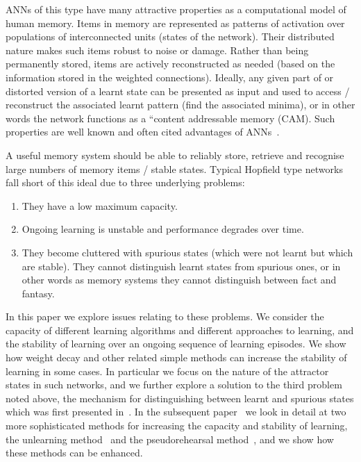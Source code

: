 ANNs of this type have many attractive properties as a computational model of human memory.   Items in memory are represented as patterns of activation over populations of interconnected units (states of the network).  Their distributed nature makes such items robust to noise or damage.  Rather than being permanently stored, items are actively reconstructed as needed (based on the information stored in the weighted connections).  Ideally, any given part of or distorted version of a learnt state can be presented as input and used to access / reconstruct the associated learnt pattern (find the associated minima), or in other words the network functions as a ``content addressable memory (CAM).  Such properties are well known and often cited advantages of ANNs~\citep{;;;etc}.

A useful memory system should be able to reliably store, retrieve and recognise large numbers of memory items / stable states.  Typical Hopfield type networks fall short of this ideal due to three underlying problems:

\begin{enumerate}
\item They have a low maximum capacity.  

\item Ongoing learning is unstable and performance degrades over time.  

\item They become cluttered with spurious states (which were not learnt but which are stable).  They cannot distinguish learnt states from spurious ones, or in other words as memory systems they cannot distinguish between fact and fantasy.  
\end{enumerate}

In this paper we explore issues relating to these problems.  We consider the capacity of different learning algorithms and different approaches to learning, and the stability of learning over an ongoing sequence of learning episodes.  We show how weight decay and other related simple methods can increase the stability of learning in some cases.  In particular we focus on the nature of the attractor states in such networks, and we further explore a solution to the third problem noted above, the mechanism for distinguishing between learnt and spurious states which was first presented in~\citet{Robins2004}.  In the subsequent paper~\citep{McCallum2010b} we look in detail at two more sophisticated methods for increasing the capacity and stability of learning, the unlearning method~\citep{Hopfield1983, vanHemmen1997}  and the pseudorehearsal method~\citep{Robins2001}, and we show how these methods can be enhanced.
 

